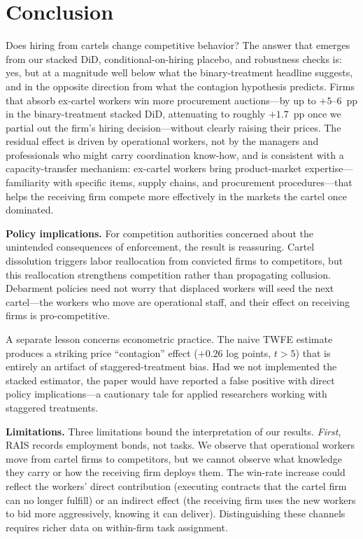 \section{Conclusion}\label{sec:conclusion}

Does hiring from cartels change competitive behavior? The answer that emerges from our stacked DiD, conditional-on-hiring placebo, and robustness checks is: yes, but at a magnitude well below what the binary-treatment headline suggests, and in the opposite direction from what the contagion hypothesis predicts. Firms that absorb ex-cartel workers win more procurement auctions---by up to $+5$--$6$~pp in the binary-treatment stacked DiD, attenuating to roughly $+1.7$~pp once we partial out the firm's hiring decision---without clearly raising their prices. The residual effect is driven by operational workers, not by the managers and professionals who might carry coordination know-how, and is consistent with a capacity-transfer mechanism: ex-cartel workers bring product-market expertise---familiarity with specific items, supply chains, and procurement procedures---that helps the receiving firm compete more effectively in the markets the cartel once dominated.

\medskip

\noindent\textbf{Policy implications.} For competition authorities concerned about the unintended consequences of enforcement, the result is reassuring. Cartel dissolution triggers labor reallocation from convicted firms to competitors, but this reallocation strengthens competition rather than propagating collusion. Debarment policies need not worry that displaced workers will seed the next cartel---the workers who move are operational staff, and their effect on receiving firms is pro-competitive.

A separate lesson concerns econometric practice. The naive TWFE estimate produces a striking price ``contagion'' effect ($+0.26$ log points, $t > 5$) that is entirely an artifact of staggered-treatment bias. Had we not implemented the stacked estimator, the paper would have reported a false positive with direct policy implications---a cautionary tale for applied researchers working with staggered treatments.

\noindent\textbf{Limitations.} Three limitations bound the interpretation of our results. \emph{First}, RAIS records employment bonds, not tasks. We observe that operational workers move from cartel firms to competitors, but we cannot observe what knowledge they carry or how the receiving firm deploys them. The win-rate increase could reflect the workers' direct contribution (executing contracts that the cartel firm can no longer fulfill) or an indirect effect (the receiving firm uses the new workers to bid more aggressively, knowing it can deliver). Distinguishing these channels requires richer data on within-firm task assignment.

